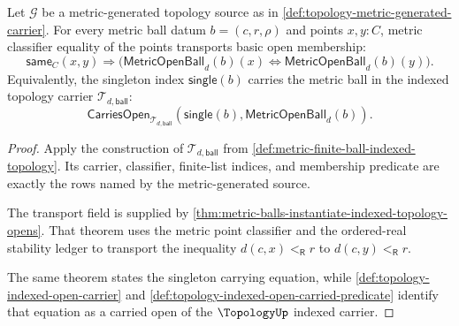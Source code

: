 \begin{theorem}
\label{thm:topology-metric-base-open-transport}
Let $\mathcal{G}$ be a metric-generated topology source as in \autoref{def:topology-metric-generated-carrier}. For every metric ball datum $b=(c,r,\rho)$ and points $x,y:C$, metric classifier equality of the points transports basic open membership:
$$
\mathsf{same}_C(x,y)
\Longrightarrow
\bigl(\mathsf{MetricOpenBall}_d(b)(x)\Longleftrightarrow\mathsf{MetricOpenBall}_d(b)(y)\bigr).
$$
Equivalently, the singleton index $\mathsf{single}(b)$ carries the metric ball in the indexed topology carrier $\mathcal{T}_{d,\mathsf{ball}}$:
$$
\mathsf{CarriesOpen}_{\mathcal{T}_{d,\mathsf{ball}}}
(\mathsf{single}(b),\mathsf{MetricOpenBall}_d(b)).
$$
\end{theorem}
\begin{proof}
Apply the construction of $\mathcal{T}_{d,\mathsf{ball}}$ from \autoref{def:metric-finite-ball-indexed-topology}. Its carrier, classifier, finite-list indices, and membership predicate are exactly the rows named by the metric-generated source.

The transport field is supplied by \autoref{thm:metric-balls-instantiate-indexed-topology-opens}. That theorem uses the metric point classifier and the ordered-real stability ledger to transport the inequality $d(c,x)<_{\mathsf R}r$ to $d(c,y)<_{\mathsf R}r$.

The same theorem states the singleton carrying equation, while \autoref{def:topology-indexed-open-carrier} and \autoref{def:topology-indexed-open-carried-predicate} identify that equation as a carried open of the $\TopologyUp$ indexed carrier.
\end{proof}

